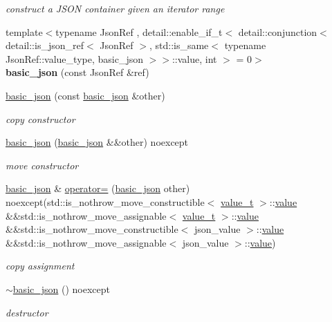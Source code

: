 \begin{DoxyCompactItemize}
\begin{DoxyCompactList}\small\item\em construct a J\+S\+ON container given an iterator range \end{DoxyCompactList}\item 
\mbox{\label{classnlohmann_1_1basic__json_a28524e9c443076ea6dccff8e391354ed}} 
{\footnotesize template$<$typename Json\+Ref , detail\+::enable\+\_\+if\+\_\+t$<$ detail\+::conjunction$<$ detail\+::is\+\_\+json\+\_\+ref$<$ Json\+Ref $>$, std\+::is\+\_\+same$<$ typename Json\+Ref\+::value\+\_\+type, basic\+\_\+json $>$$>$\+::value, int $>$  = 0$>$ }\\{\bfseries basic\+\_\+json} (const Json\+Ref \&ref)
\item 
\hyperlink{classnlohmann_1_1basic__json_a603be713183ad63dd8c9e1052c606004}{basic\+\_\+json} (const \hyperlink{classnlohmann_1_1basic__json}{basic\+\_\+json} \&other)
\begin{DoxyCompactList}\small\item\em copy constructor \end{DoxyCompactList}\item 
\hyperlink{classnlohmann_1_1basic__json_a642afd9d8886e0dedfc0d5cee2baf57f}{basic\+\_\+json} (\hyperlink{classnlohmann_1_1basic__json}{basic\+\_\+json} \&\&other) noexcept
\begin{DoxyCompactList}\small\item\em move constructor \end{DoxyCompactList}\item 
\hyperlink{classnlohmann_1_1basic__json}{basic\+\_\+json} \& \hyperlink{classnlohmann_1_1basic__json_a1ae937c299f347a9dcb7f31a8e57762b}{operator=} (\hyperlink{classnlohmann_1_1basic__json}{basic\+\_\+json} other) noexcept(std\+::is\+\_\+nothrow\+\_\+move\+\_\+constructible$<$ \hyperlink{namespacenlohmann_1_1detail_a1ed8fc6239da25abcaf681d30ace4985}{value\+\_\+t} $>$\+::\hyperlink{classnlohmann_1_1basic__json_a11641b35219676b225d9bd15c7677659}{value} \&\&std\+::is\+\_\+nothrow\+\_\+move\+\_\+assignable$<$ \hyperlink{namespacenlohmann_1_1detail_a1ed8fc6239da25abcaf681d30ace4985}{value\+\_\+t} $>$\+::\hyperlink{classnlohmann_1_1basic__json_a11641b35219676b225d9bd15c7677659}{value} \&\&std\+::is\+\_\+nothrow\+\_\+move\+\_\+constructible$<$ json\+\_\+value $>$\+::\hyperlink{classnlohmann_1_1basic__json_a11641b35219676b225d9bd15c7677659}{value} \&\&std\+::is\+\_\+nothrow\+\_\+move\+\_\+assignable$<$ json\+\_\+value $>$\+::\hyperlink{classnlohmann_1_1basic__json_a11641b35219676b225d9bd15c7677659}{value})
\begin{DoxyCompactList}\small\item\em copy assignment \end{DoxyCompactList}\item 
\hyperlink{classnlohmann_1_1basic__json_a60b643c02a19fa52f99db8215ff58e0f}{$\sim$basic\+\_\+json} () noexcept
\begin{DoxyCompactList}\small\item\em destructor \end{DoxyCompactList}\end{DoxyCompactItemize}
